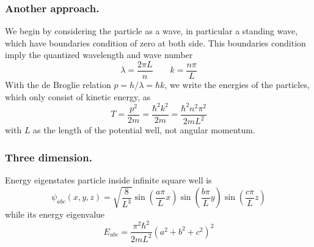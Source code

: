 \documentclass[../../main.tex]{subfiles}
\begin{document}
\subsubsection*{Another approach.} 
We begin by considering the particle as a wave, in particular a standing wave, which have boundaries condition of zero at both side.
This boundaries condition imply the quantized wavelength and wave number
\begin{equation*}
    \lambda=\frac{2\pi L }{n}\qquad k=\frac{n\pi }{L}
\end{equation*}
With the de Broglie relation $p=h/\lambda=\hbar k$, we write the energies of the particles, which only consist of kinetic energy, as 
\begin{equation*}
    T=\frac{p^2 }{2m }=\frac{\hbar^2 k^2 }{2m}=\frac{\hbar^2n^2\pi^2}{2mL^2}
\end{equation*}
with $L$ as the length of the potential well, not angular momentum.

\subsubsection{Three dimension.} Energy eigenstates particle inside infinite square well is
\begin{equation*}
    \psi_{abc}(x,y,z)=\sqrt{\frac{8}{L^3}}\sin( \frac{a \pi }{L}x) \sin( \frac{b \pi }{L}y) \sin( \frac{c \pi }{L}z)
\end{equation*}
while its energy eigenvalue
\begin{equation*}
    E_{abc}=\frac{\pi^2\hbar^2}{2mL^2}(a^2+b^2+c^2)^2
\end{equation*}
\end{document}
